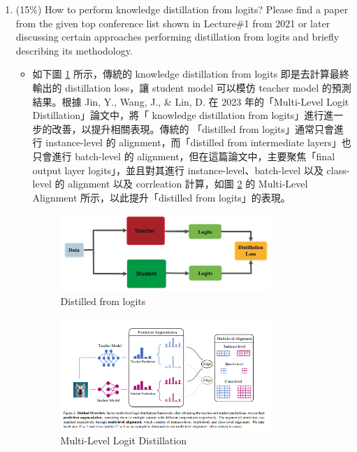 \documentclass[10pt,a4paper]{article}
\begin{document}
\begin{enumerate}
\item (15\%) How to perform knowledge distillation from logits? Please find a paper from the given top conference list shown in Lecture\#1 from 2021 or later discussing certain approaches performing distillation from logits and briefly describing its methodology.
\begin{itemize}
\item 如下圖 \ref{fig:Distillation_logit} 所示，傳統的 knowledge distillation from logits 即是去計算最終輸出的 distillation loss，讓 student model 可以模仿 teacher model 的預測結果。根據 Jin, Y., Wang, J., \& Lin, D. 在 2023 年的「Multi-Level Logit Distillation」論文中，將「 knowledge distillation from logits」進行進一步的改善，以提升相關表現。傳統的 「distilled from logits」通常只會進行 instance-level 的 alignment，而「distilled from intermediate layers」也只會進行 batch-level 的 alignment，但在這篇論文中，主要聚焦「final output layer logits」，並且對其進行 instance-level、batch-level 以及 class-level 的 alignment 以及 corrleation 計算，如圖 \ref{fig:Multi-Level_Logit_Distillation} 的 Multi-Level Alignment 所示，以此提升「distilled from logits」的表現。
\begin{figure}[hbt]
\centering
\includegraphics[width=0.8\textwidth]{Distillation_logit.png}
\caption{Distilled from logits}
\label{fig:Distillation_logit}
\end{figure}

\begin{figure}[hbt]
\centering
\includegraphics[width=0.8\textwidth]{Multi-Level_Logit_Distillation.png}
\caption{Multi-Level Logit Distillation}
\label{fig:Multi-Level_Logit_Distillation}
\end{figure}


\end{itemize}
\end{enumerate}
\end{document}
